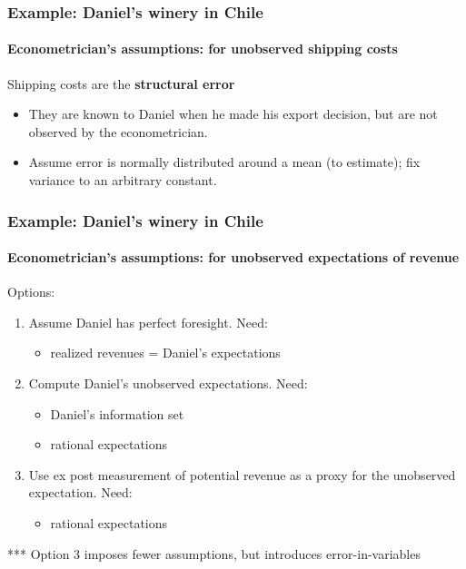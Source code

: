 \documentclass[10pt,letterpaper]{beamer}
\begin{document}

\begin{frame}
\frametitle{Example: Daniel's winery in Chile} %
\framesubtitle{Econometrician's assumptions: for unobserved shipping costs}

Shipping costs are the \textbf{structural error}

\begin{itemize}
\item They are known to Daniel when he made his export decision, but are not
observed by the econometrician.

\item Assume error is normally distributed around a mean (to estimate); fix
variance to an arbitrary constant.
\end{itemize}
\end{frame}


\begin{frame}
\frametitle{Example: Daniel's winery in Chile} %
\framesubtitle{Econometrician's assumptions: for unobserved expectations of
revenue}

Options:

\begin{enumerate}
\item Assume Daniel has perfect foresight. Need: 

\begin{itemize}
\item realized revenues = Daniel's expectations 
\end{itemize}

\item Compute Daniel's unobserved expectations. Need: 

\begin{itemize}
\item Daniel's information set 

\item rational expectations 
\end{itemize}

\item Use ex post measurement of potential revenue as a proxy for the
unobserved expectation. Need: 

\begin{itemize}
\item rational expectations 
\end{itemize}
\end{enumerate}

*** Option 3 imposes fewer assumptions, but introduces error-in-variables
\end{frame}
\end{document}
